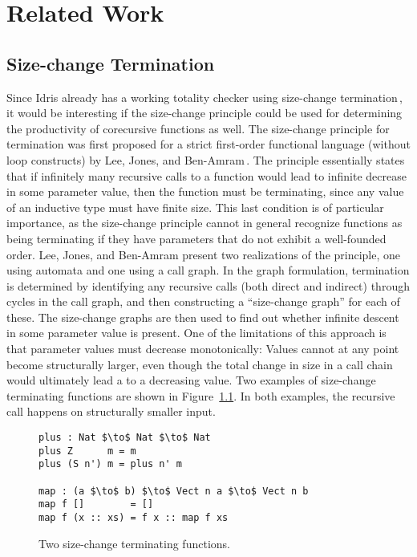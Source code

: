 \chapter{Related Work}


\section{Size-change Termination}
Since Idris already has a working totality checker using size-change termination\,\citep{BradyIdrisImpl13}, it would be interesting if the size-change principle could be used for determining the productivity of corecursive functions as well. The size-change principle for termination was first proposed for a strict first-order functional language (without loop constructs) by Lee, Jones, and Ben-Amram\,\citep{LeeJones01SizeChange}. The principle essentially states that if infinitely many recursive calls to a function would lead to infinite decrease in some parameter value, then the function must be terminating, since any value of an inductive type must have finite size. This last condition is of particular importance, as the size-change principle cannot in general recognize functions as being terminating if they have parameters that do not exhibit a well-founded order. Lee, Jones, and Ben-Amram present two realizations of the principle, one using automata and one using a call graph. In the graph formulation, termination is determined by identifying any recursive calls (both direct and indirect) through cycles in the call graph, and then constructing a ``size-change graph'' for each of these. The size-change graphs are then used to find out whether infinite descent in some parameter value is present. One of the limitations of this approach is that parameter values must decrease monotonically: Values cannot at any point become structurally larger, even though the total change in size in a call chain would ultimately lead a to a decreasing value. Two examples of size-change terminating functions are shown in Figure~\ref{fig:sizechange_plus_map}. In both examples, the recursive call happens on structurally smaller input.

\begin{figure}
\begin{lstlisting}[mathescape]
plus : Nat $\to$ Nat $\to$ Nat
plus Z      m = m
plus (S n') m = plus n' m

map : (a $\to$ b) $\to$ Vect n a $\to$ Vect n b
map f []        = []
map f (x :: xs) = f x :: map f xs
\end{lstlisting}
\caption{Two size-change terminating functions.}
\label{fig:sizechange_plus_map}
\end{figure}

